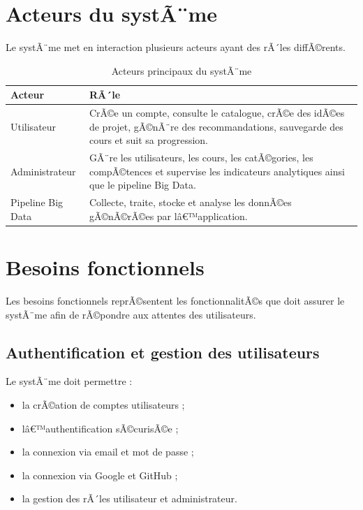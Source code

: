 ﻿\documentclass[12pt,a4paper]{report}
\begin{document}
\section{Acteurs du systÃ¨me}

Le systÃ¨me met en interaction plusieurs acteurs ayant des rÃ´les diffÃ©rents.

\begin{table}[H]
    \centering
    \caption{Acteurs principaux du systÃ¨me}
    
    \begin{tabular}{|p{4cm}|p{9cm}|}
        \hline
        \textbf{Acteur} & \textbf{RÃ´le} \\
        \hline
        
        Utilisateur &
        CrÃ©e un compte, consulte le catalogue, crÃ©e des idÃ©es de projet, gÃ©nÃ¨re des recommandations, sauvegarde des cours et suit sa progression. \\
        
        \hline
        
        Administrateur &
        GÃ¨re les utilisateurs, les cours, les catÃ©gories, les compÃ©tences et supervise les indicateurs analytiques ainsi que le pipeline Big Data. \\
        
        \hline
        
        Pipeline Big Data &
        Collecte, traite, stocke et analyse les donnÃ©es gÃ©nÃ©rÃ©es par lâ€™application. \\
        
        \hline
    \end{tabular}
\end{table}

\section{Besoins fonctionnels}

Les besoins fonctionnels reprÃ©sentent les fonctionnalitÃ©s que doit assurer le systÃ¨me afin de rÃ©pondre aux attentes des utilisateurs.

\subsection{Authentification et gestion des utilisateurs}

Le systÃ¨me doit permettre :
\begin{itemize}
    \item la crÃ©ation de comptes utilisateurs ;
    \item lâ€™authentification sÃ©curisÃ©e ;
    \item la connexion via email et mot de passe ;
    \item la connexion via Google et GitHub ;
    \item la gestion des rÃ´les utilisateur et administrateur.
\end{itemize}
\end{document}
